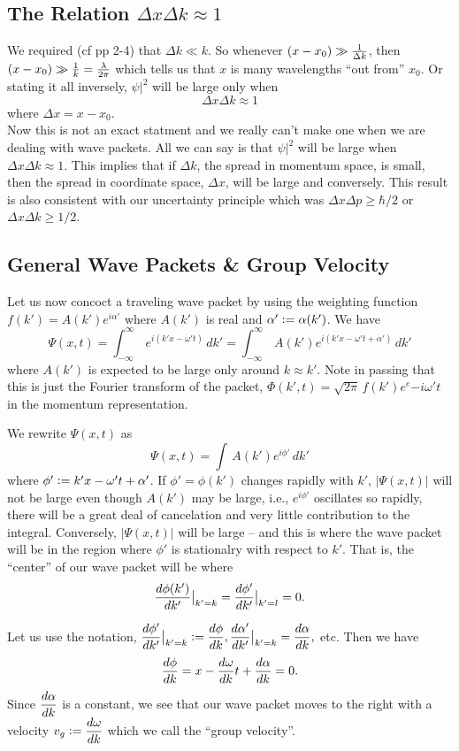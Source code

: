 \subsection{The Relation $\Delta x \Delta k \approx 1$}
We required (cf pp 2-4) that $\Delta k \ll k$. So whenever $(x-x_0) \gg {1\over \Delta k}$, then $(x-x_0) \gg {1\over k} = {\lambda\over2\pi}$ which tells us that $x$ is many wavelengths ``out from'' $x_0$. Or 
stating it all inversely, $\psi|^2$ will be large only when $$\Delta x\Delta k \approx 1$$ where $\Delta x = x-x_0$.\\
Now this is not an exact statment and we really can't make one when we are dealing with wave packets. All we can say is that $\psi|^2$ will be large when $\Delta x\Delta k\approx 1$. This implies that 
if $\Delta k$, the spread in momentum space, is small, then the spread in coordinate space, $\Delta x$, will be large and conversely. This result is also consistent with our uncertainty principle which was
$\Delta x\Delta p \ge \hbar/2$ or $\Delta x\Delta k \ge 1/2$.

\subsection{General Wave Packets \& Group Velocity}
Let us now concoct a traveling wave packet by using the weighting function $\displaystyle f(k') = A(k') e^{i\alpha'}$ where $A(k')$ is real and $\alpha' \mathrel{\mathop:}= \alpha(k')$. We have
$$\Psi(x,t) = \int_{-\infty}^{\infty}\, e^{i(k'x - \omega't)}\, dk' = \int_{-\infty}^\infty\, A(k') e^{i(k'x - \omega't + \alpha')}\, dk'$$ where $A(k')$ is expected to be large only around $k\approx k'$. Note in passing that this is just
the Fourier transform of the packet, $\Phi(k',t) = \sqrt{2\pi}\, f(k') e^e{-i\omega't}$ in the momentum representation.

We rewrite $\Psi(x,t)$ as 
$$\Psi(x,t) = \int\, A(k') e^{i\phi'}\, dk'$$ where $\phi' \mathrel{\mathop:}= k'x -\omega't + \alpha'$. If $\phi' = \phi(k')$ changes rapidly with $k'$, $|\Psi(x,t)|$ will not be large even though $A(k')$ may be large, i.e., $e^{i\phi'}$ oscillates so
rapidly, there will be a great deal of cancelation and very little contribution to the integral. Conversely, $|\Psi(x,t)|$ will be large -- and this is where the wave packet will be in the region where $\phi'$ is stationalry with respect 
to $k'$. That is, the ``center'' of our wave packet will be where
$${d\phi(k')\over dk'}\big|_{k'=k} = {d\phi'\over dk'}\big|_{k'=l} = 0.$$

Let us use the notation, $\displaystyle {d\phi'\over dk'}\big|_{k' = k} \mathrel{\mathop:}= {d\phi\over dk}, {d\alpha'\over dk'}\big|_{k'=k} = {d\alpha\over dk},$ etc. Then we have
$${d\phi\over dk} = x -{d\omega\over dk} t + {d\alpha\over dk} = 0.$$ Since $\displaystyle {d\alpha\over dk}$ is a constant, we see that our wave packet moves to the right with a velocity 
$\displaystyle v_g \mathrel{\mathop:}= {d\omega\over dk}$ which we call the ``group velocity''. 

